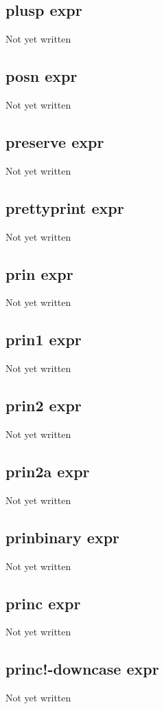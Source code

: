 \documentclass[a4paper,11pt]{article}
\begin{document}
\subsection{\ttfamily plusp expr}
Not yet written

\subsection{\ttfamily posn expr}
Not yet written

\subsection{\ttfamily preserve expr}
Not yet written

\subsection{\ttfamily prettyprint expr}
Not yet written

\subsection{\ttfamily prin expr}
Not yet written

\subsection{\ttfamily prin1 expr}
Not yet written

\subsection{\ttfamily prin2 expr}
Not yet written

\subsection{\ttfamily prin2a expr}
Not yet written

\subsection{\ttfamily prinbinary expr}
Not yet written

\subsection{\ttfamily princ expr}
Not yet written

\subsection{\ttfamily princ!-downcase expr}
Not yet written
\end{document}

